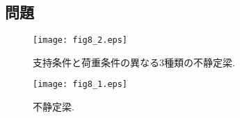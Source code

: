 ﻿\documentclass[10pt,a4j]{jarticle}
\begin{document}
\subsection{問題}
\begin{figure}
	\begin{center}
	\texttt{[image: fig8\_2.eps]} 
	\end{center}
	\caption{支持条件と荷重条件の異なる3種類の不静定梁.} 
	\label{fig:fig8_2}
\end{figure}
\begin{figure}
	\begin{center}
	\texttt{[image: fig8\_1.eps]} 
	\end{center}
	\caption{不静定梁.} 
	\label{fig:fig8_1}
\end{figure}
\end{document}
